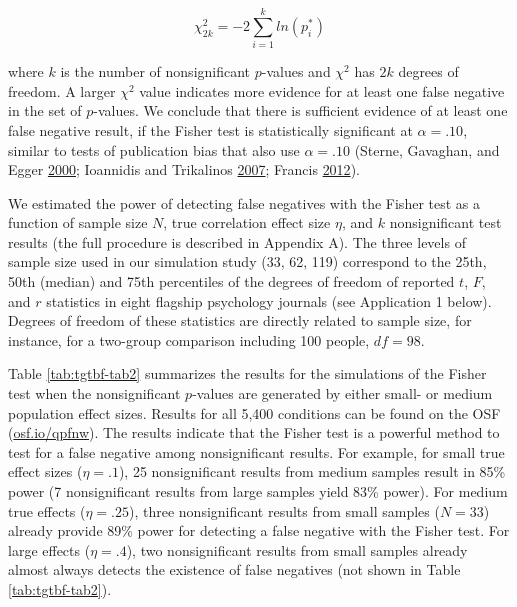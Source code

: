 \documentclass[a5paper]{book}
\begin{document}
\begin{equation}
\chi^2_{2k}=-2\sum\limits^k_{i=1}ln(p^*_i)
\label{eq:fishertest}
\end{equation}

where \(k\) is the number of nonsignificant \(p\)-values and \(\chi^2\)
has \(2k\) degrees of freedom. A larger \(\chi^2\) value indicates more
evidence for at least one false negative in the set of \(p\)-values. We
conclude that there is sufficient evidence of at least one false
negative result, if the Fisher test is statistically significant at
\(\alpha=.10\), similar to tests of publication bias that also use
\(\alpha=.10\) (Sterne, Gavaghan, and Egger
\protect\hyperlink{ref-doi:10.1016ux2fs0895-43560000242-0}{2000};
Ioannidis and Trikalinos
\protect\hyperlink{ref-doi:10.1177ux2f1740774507079441}{2007}; Francis
\protect\hyperlink{ref-doi:10.3758ux2fs13423-012-0227-9}{2012}).

We estimated the power of detecting false negatives with the Fisher test
as a function of sample size \(N\), true correlation effect size
\(\eta\), and \(k\) nonsignificant test results (the full procedure is
described in Appendix A). The three levels of sample size used in our
simulation study (33, 62, 119) correspond to the 25th, 50th (median) and
75th percentiles of the degrees of freedom of reported \(t\), \(F\), and
\(r\) statistics in eight flagship psychology journals (see Application
1 below). Degrees of freedom of these statistics are directly related to
sample size, for instance, for a two-group comparison including 100
people, \(df=98\).

Table \ref{tab:tgtbf-tab2} summarizes the results for the simulations of
the Fisher test when the nonsignificant \(p\)-values are generated by
either small- or medium population effect sizes. Results for all 5,400
conditions can be found on the OSF
(\href{https://osf.io/qpfnw}{osf.io/qpfnw}). The results indicate that
the Fisher test is a powerful method to test for a false negative among
nonsignificant results. For example, for small true effect sizes
(\(\eta=.1\)), 25 nonsignificant results from medium samples result in
85\% power (7 nonsignificant results from large samples yield 83\%
power). For medium true effects (\(\eta=.25\)), three nonsignificant
results from small samples (\(N=33\)) already provide 89\% power for
detecting a false negative with the Fisher test. For large effects
(\(\eta=.4\)), two nonsignificant results from small samples already
almost always detects the existence of false negatives (not shown in
Table \ref{tab:tgtbf-tab2}).
\end{document}
